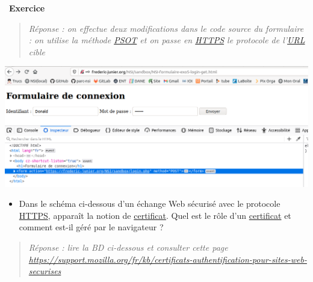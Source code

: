 \documentclass[
  11pt,
]{article}
\providecommand{\tightlist}{%
  \setlength{\itemsep}{0pt}\setlength{\parskip}{0pt}}
\newcounter{exo}
\newenvironment{exercice}[1]
{\par \medskip   \addtocounter{exo}{1} \noindent  
\begin{bclogo}[arrondi =0.1,   noborder = true, logo=\bccrayon, marge=4]{~\textbf{Exercice} \textbf{\theexo} {\itshape #1} }  \par}
{
\end{bclogo}
 \par \bigskip }
\newcounter{logi}
\begin{document}
\begin{exercice}{}
\begin{quote}
\emph{Réponse : on effectue deux modifications dans le code source du
formulaire : on utilise la méthode \href{POST}{PSOT} et on passe en
\url{HTTPS} le protocole de l'\url{URL} cible}
\end{quote}

\includegraphics{images/login_https.png}\\

\begin{itemize}
\tightlist
\item
  Dans le schéma ci-dessous d'un échange Web sécurisé avec le protocole
  \href{https://developer.mozilla.org/fr/docs/Glossaire/https}{HTTPS},
  apparaît la notion de
  \href{https://developer.mozilla.org/fr/docs/Glossaire/Certificat_num\%C3\%A9rique}{certificat}.
  Quel est le rôle d'un
  \href{https://developer.mozilla.org/fr/docs/Glossaire/Certificat_num\%C3\%A9rique}{certificat}
  et comment est-il géré par le navigateur ?
\end{itemize}

\begin{quote}
\emph{Réponse : lire la BD ci-dessous et consulter cette page
\url{https://support.mozilla.org/fr/kb/certificats-authentification-pour-sites-web-securises}}
\end{quote}


\end{exercice}
\end{document}
